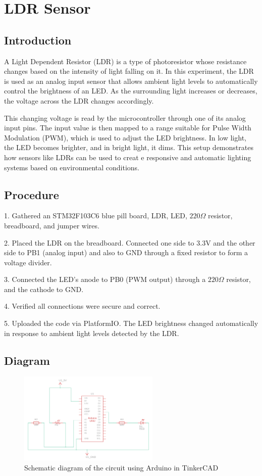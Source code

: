 
\section{LDR Sensor}

\subsection{Introduction}
A Light Dependent Resistor (LDR) is a type of photoresistor 
whose resistance changes based on the intensity of light falling on it.
In this experiment, the LDR is used as an analog input sensor that allows
ambient light levels to automatically control the brightness of an LED.
As the surrounding light increases or decreases, the voltage across the LDR
changes accordingly.

This changing voltage is read by the microcontroller through one of its
analog input pins. The input value is then mapped to a range suitable
for Pulse Width Modulation (PWM), which is used to adjust the LED brightness.
In low light, the LED becomes brighter, and in bright light, it dims.
This setup demonstrates how sensors like LDRs can be used to creat
e responsive and automatic lighting systems based on environmental conditions.
\subsection{Procedure}
1. Gathered an STM32F103C6 blue pill board, LDR, LED, $220\Omega$ resistor, breadboard, and jumper wires.

2. Placed the LDR on the breadboard. Connected one side to 3.3V and the other side to PB1 (analog input) and also to GND through a fixed resistor to form a voltage divider.

3. Connected the LED's anode to PB0 (PWM output) through a $220\Omega$ resistor, and the cathode to GND.

4. Verified all connections were secure and correct.

5. Uploaded the code via PlatformIO. The LED brightness changed automatically in response to ambient light levels detected by the LDR.
\subsection{Diagram}
\begin{figure}[htbp]
    \centering
    \includegraphics[width=0.6\textwidth]{img/ldr.png}
    \caption{Schematic diagram of the circuit using Arduino in TinkerCAD}\label{fig:ldrr}
\end{figure}

